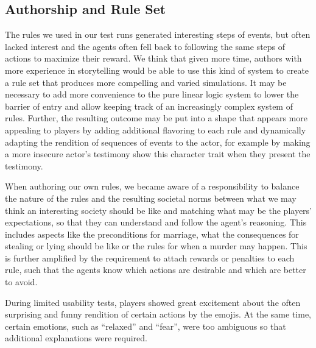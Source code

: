 \subsection{Authorship and Rule Set}
The rules we used in our test runs generated interesting steps of events, but often lacked interest and the agents often fell back to following the same steps of actions to maximize their reward.
We think that given more time, authors with more experience in storytelling would be able to use this kind of system to create a rule set that produces more compelling and varied simulations.
It may be necessary to add more convenience to the pure linear logic system to lower the barrier of entry and allow keeping track of an increasingly complex system of rules.
Further, the resulting outcome may be put into a shape that appears more appealing to players by adding additional flavoring to each rule and dynamically adapting the rendition of sequences of events to the actor, for example by making a more insecure actor's testimony show this character trait when they present the testimony.

When authoring our own rules, we became aware of a responsibility to balance the nature of the rules and the resulting societal norms between what we may think an interesting society should be like and matching what may be the players' expectations, so that they can understand and follow the agent's reasoning.
This includes aspects like the preconditions for marriage, what the consequences for stealing or lying should be like or the rules for when a murder may happen.
This is further amplified by the requirement to attach rewards or penalties to each rule, such that the agents know which actions are desirable and which are better to avoid.

During limited usability tests, players showed great excitement about the often surprising and funny rendition of certain actions by the emojis.
At the same time, certain emotions, such as \enquote{relaxed} and \enquote{fear}, were too ambiguous so that additional explanations were required.
